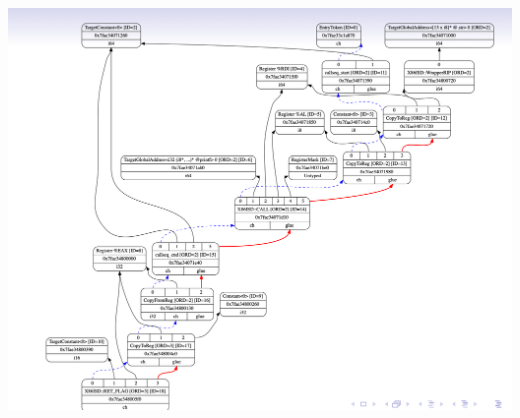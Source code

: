 \documentclass[a4paper]{exam}
\theoremstyle{definition}
\begin{document}
\begin{center}
  \includegraphics[height=12cm]{img/llvm_peephole.png}
\end{center}

\printbibliography
\end{document}
